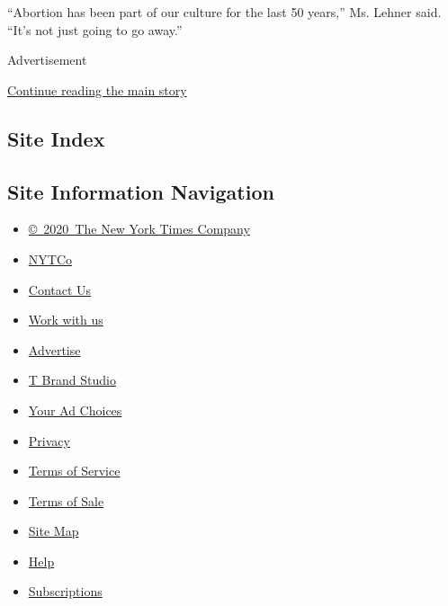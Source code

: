 ``Abortion has been part of our culture for the last 50 years,'' Ms.
Lehner said. ``It's not just going to go away.''

Advertisement

\protect\hyperlink{after-bottom}{Continue reading the main story}

\hypertarget{site-index}{%
\subsection{Site Index}\label{site-index}}

\hypertarget{site-information-navigation}{%
\subsection{Site Information
Navigation}\label{site-information-navigation}}

\begin{itemize}
\tightlist
\item
  \href{https://help.nytimes.com/hc/en-us/articles/115014792127-Copyright-notice}{©~2020~The
  New York Times Company}
\end{itemize}

\begin{itemize}
\tightlist
\item
  \href{https://www.nytco.com/}{NYTCo}
\item
  \href{https://help.nytimes.com/hc/en-us/articles/115015385887-Contact-Us}{Contact
  Us}
\item
  \href{https://www.nytco.com/careers/}{Work with us}
\item
  \href{https://nytmediakit.com/}{Advertise}
\item
  \href{http://www.tbrandstudio.com/}{T Brand Studio}
\item
  \href{https://www.nytimes.com/privacy/cookie-policy\#how-do-i-manage-trackers}{Your
  Ad Choices}
\item
  \href{https://www.nytimes.com/privacy}{Privacy}
\item
  \href{https://help.nytimes.com/hc/en-us/articles/115014893428-Terms-of-service}{Terms
  of Service}
\item
  \href{https://help.nytimes.com/hc/en-us/articles/115014893968-Terms-of-sale}{Terms
  of Sale}
\item
  \href{https://spiderbites.nytimes.com}{Site Map}
\item
  \href{https://help.nytimes.com/hc/en-us}{Help}
\item
  \href{https://www.nytimes.com/subscription?campaignId=37WXW}{Subscriptions}
\end{itemize}

